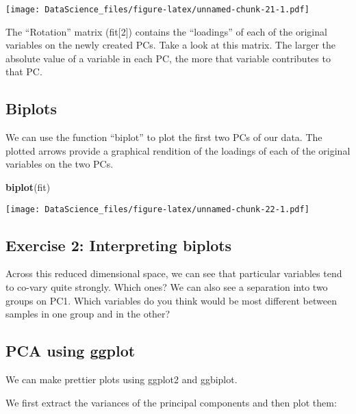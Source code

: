 \documentclass[
]{book}
\newenvironment{Shaded}{\begin{snugshade}}{\end{snugshade}}
\newcommand{\KeywordTok}[1]{\textcolor[rgb]{0.13,0.29,0.53}{\textbf{#1}}}
\newcommand{\NormalTok}[1]{#1}
\begin{document}
\texttt{[image: DataScience\_files/figure-latex/unnamed-chunk-21-1.pdf]}

The ``Rotation'' matrix (fit{[}2{]}) contains the ``loadings'' of each of the original variables on the newly created PCs. Take a look at this matrix. The larger the absolute value of a variable in each PC, the more that variable contributes to that PC.

\hypertarget{biplots}{%
\subsection{Biplots}\label{biplots}}

We can use the function ``biplot'' to plot the first two PCs of our data. The plotted arrows provide a graphical rendition of the loadings of each of the original variables on the two PCs.

\begin{Shaded}
\begin{Highlighting}[]
\KeywordTok{biplot}\NormalTok{(fit)}
\end{Highlighting}
\end{Shaded}

\texttt{[image: DataScience\_files/figure-latex/unnamed-chunk-22-1.pdf]}

\hypertarget{exercise-2-interpreting-biplots}{%
\subsection{Exercise 2: Interpreting biplots}\label{exercise-2-interpreting-biplots}}

Across this reduced dimensional space, we can see that particular variables tend to co-vary quite strongly. Which ones? We can also see a separation into two groups on PC1. Which variables do you think would be most different between samples in one group and in the other?

\hypertarget{pca-using-ggplot}{%
\subsection{PCA using ggplot}\label{pca-using-ggplot}}

We can make prettier plots using ggplot2 and ggbiplot.

We first extract the variances of the principal components and then plot them:
\end{document}
